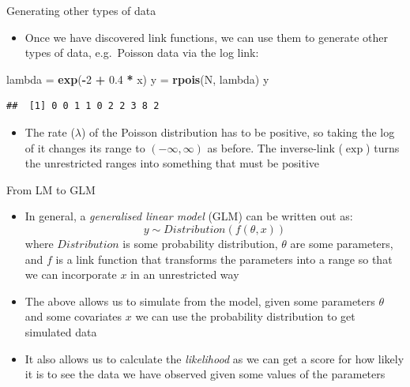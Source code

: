 \documentclass[ignorenonframetext,]{beamer}
\newenvironment{Shaded}{\begin{snugshade}}{\end{snugshade}}
\newcommand{\KeywordTok}[1]{\textcolor[rgb]{0.13,0.29,0.53}{\textbf{#1}}}
\newcommand{\DecValTok}[1]{\textcolor[rgb]{0.00,0.00,0.81}{#1}}
\newcommand{\FloatTok}[1]{\textcolor[rgb]{0.00,0.00,0.81}{#1}}
\newcommand{\StringTok}[1]{\textcolor[rgb]{0.31,0.60,0.02}{#1}}
\newcommand{\OperatorTok}[1]{\textcolor[rgb]{0.81,0.36,0.00}{\textbf{#1}}}
\newcommand{\NormalTok}[1]{#1}
\providecommand{\tightlist}{%
  \setlength{\itemsep}{0pt}\setlength{\parskip}{0pt}}
\begin{document}
\begin{frame}[fragile]{Generating other types of data}

\begin{itemize}
\tightlist
\item
  Once we have discovered link functions, we can use them to generate
  other types of data, e.g.~Poisson data via the log link:
\end{itemize}

\begin{Shaded}
\begin{Highlighting}[]
\NormalTok{lambda =}\StringTok{ }\KeywordTok{exp}\NormalTok{(}\OperatorTok{-}\DecValTok{2} \OperatorTok{+}\StringTok{ }\FloatTok{0.4} \OperatorTok{*}\StringTok{ }\NormalTok{x)}
\NormalTok{y =}\StringTok{ }\KeywordTok{rpois}\NormalTok{(N, lambda)}
\NormalTok{y}
\end{Highlighting}
\end{Shaded}

\begin{verbatim}
##  [1] 0 0 1 1 0 2 2 3 8 2
\end{verbatim}

\begin{itemize}
\tightlist
\item
  The rate (\(\lambda\)) of the Poisson distribution has to be positive,
  so taking the log of it changes its range to \((-\infty,\infty)\) as
  before. The inverse-link (\(\exp\)) turns the unrestricted ranges into
  something that must be positive
\end{itemize}

\end{frame}

\begin{frame}{From LM to GLM}

\begin{itemize}
\item
  In general, a \emph{generalised linear model} (GLM) can be written out
  as: \[y \sim Distribution(f(\theta, x))\] where \(Distribution\) is
  some probability distribution, \(\theta\) are some parameters, and
  \(f\) is a link function that transforms the parameters into a range
  so that we can incorporate \(x\) in an unrestricted way
\item
  The above allows us to simulate from the model, given some parameters
  \(\theta\) and some covariates \(x\) we can use the probability
  distribution to get simulated data
\item
  It also allows us to calculate the \emph{likelihood} as we can get a
  score for how likely it is to see the data we have observed given some
  values of the parameters
\end{itemize}

\end{frame}
\end{document}

